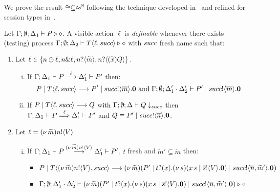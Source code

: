 We prove the result $\cong \subseteq \approx^\mathtt{H}$ following
the technique developed in~\cite{Hennessy07} and
refined for session types in~\cite{KYHH2015,KY2015}.


\begin{definition}[Definability]\myrm
	\label{app:def:definibility}
	Let $\Gamma; \emptyset; \Delta_1 \vdash P \triangleright \diamond$.
	A visible action $\ell$ is \emph{definable} whenever
	there exists (testing) process
	$\Gamma; \emptyset; \Delta_2 \vdash T\langle \ell, succ \rangle \triangleright \diamond$
	with $succ$ fresh name %
	such that:
%
	\begin{enumerate}
		\item	Let $\ell \in \{n \oplus \ell, n \& \ell, n ? \langle \widetilde{m} \rangle, n ? \langle (\widetilde{x}) Q \rangle\}$.
		
			\begin{enumerate}[i.]
				\item	If $\Gamma; \Delta_1 \vdash P \stackrel{\ell}{\longrightarrow} \Delta_1' \vdash P'$
						then:
						\[
							P \;|\; T\langle \ell, succ \rangle \longrightarrow P' \;|\; succ ! \langle \overline{m} \rangle . \mathbf{0} \textrm{ and }
							\Gamma; \emptyset; \Delta_1' \cdot \Delta_2' \vdash P' \;|\; succ ! \langle \overline{m} \rangle . \mathbf{0}
						\]

				\item
						If $P \;|\; T\langle \ell, succ \rangle \longrightarrow Q$ with			
						$\Gamma; \emptyset; \Delta \vdash Q \downarrow_{succ}$ then \\
						$\Gamma; \Delta_1 \vdash P \stackrel{\ell}{\Longrightarrow} \Delta_1' \vdash P'$
						and $Q \equiv P' \;|\; succ ! \langle \overline{n} \rangle . \mathbf{0}$.
			\end{enumerate}
%
 		\item Let	$\ell = (\nu\, \widetilde{m})n ! \langle V \rangle$

			\begin{enumerate}[i.]
				\item	If $\Gamma; \Delta_1 \vdash P \stackrel{(\nu\, \widetilde{m})n ! \langle V \rangle}{\longrightarrow} \Delta_1' \vdash P'$,
						$t$ fresh
						and $\widetilde{m}' \subseteq \widetilde{m}$
						then:
%
						\begin{itemize}
							\item $P \;|\; T\langle (\nu\, \widetilde{m})n ! \langle V \rangle, succ \rangle \longrightarrow
							(\nu\, \widetilde{m})(P' \;|\; t ? (x) . (\nu\, s)(x\, {s} \;|\; \overline{s} ! \langle V \rangle . \mathbf{0}) \;|\; succ ! \langle \overline{n}, \widetilde{m}' \rangle . \mathbf{0})$
							\item $\Gamma; \emptyset; \Delta_1' \cdot \Delta_2' \vdash
							(\nu\, \widetilde{m})(P' \;|\; t ? (x) . (\nu\, s)(x\, {s} \;|\; \overline{s} ! \langle V \rangle . \mathbf{0}) \;|\;  succ ! \langle \overline{n}, \widetilde{m}' \rangle . \mathbf{0}) \triangleright \diamond$
						\end{itemize}


\end{enumerate}
\end{enumerate}
\end{definition}
